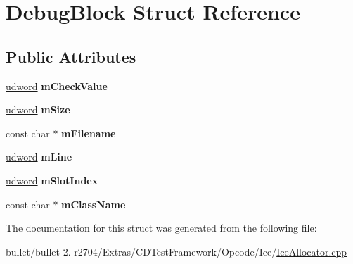 \hypertarget{struct_debug_block}{\section{Debug\+Block Struct Reference}
\label{struct_debug_block}
}
\subsection*{Public Attributes}
\begin{DoxyCompactItemize}
\item 
\hypertarget{struct_debug_block_a430ffe8b21e19ae05b6327a4ddddaf2f}{\hyperlink{_ice_types_8h_a44c6f1920ba5551225fb534f9d1a1733}{udword} {\bfseries m\+Check\+Value}}\label{struct_debug_block_a430ffe8b21e19ae05b6327a4ddddaf2f}

\item 
\hypertarget{struct_debug_block_a24fac510d2159faa439811a2656b1917}{\hyperlink{_ice_types_8h_a44c6f1920ba5551225fb534f9d1a1733}{udword} {\bfseries m\+Size}}\label{struct_debug_block_a24fac510d2159faa439811a2656b1917}

\item 
\hypertarget{struct_debug_block_aed628c5984f6565cc5a12794c33101e6}{const char $\ast$ {\bfseries m\+Filename}}\label{struct_debug_block_aed628c5984f6565cc5a12794c33101e6}

\item 
\hypertarget{struct_debug_block_a9550f4cf070dc499db0a659bc2054dea}{\hyperlink{_ice_types_8h_a44c6f1920ba5551225fb534f9d1a1733}{udword} {\bfseries m\+Line}}\label{struct_debug_block_a9550f4cf070dc499db0a659bc2054dea}

\item 
\hypertarget{struct_debug_block_a830578bf4480de3a3619cca79fbac2ae}{\hyperlink{_ice_types_8h_a44c6f1920ba5551225fb534f9d1a1733}{udword} {\bfseries m\+Slot\+Index}}\label{struct_debug_block_a830578bf4480de3a3619cca79fbac2ae}

\item 
\hypertarget{struct_debug_block_a4f73d43880e8833b8a1c4a9a5594a18b}{const char $\ast$ {\bfseries m\+Class\+Name}}\label{struct_debug_block_a4f73d43880e8833b8a1c4a9a5594a18b}

\end{DoxyCompactItemize}


The documentation for this struct was generated from the following file\+:\begin{DoxyCompactItemize}
\item 
bullet/bullet-\/2.-\/r2704/\+Extras/\+C\+D\+Test\+Framework/\+Opcode/\+Ice/\hyperlink{_ice_allocator_8cpp}{Ice\+Allocator.\+cpp}\end{DoxyCompactItemize}
